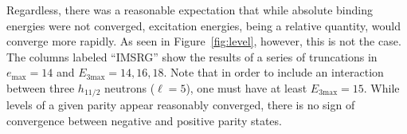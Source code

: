 \documentclass[twocolumn,prc,showpacs,preprintnumbers,amsmath,amssymb,superscriptaddress,nofootinbib,aps,10pt]{revtex4-1}
\begin{document}
Regardless, there was a reasonable expectation that while absolute binding energies were not converged, excitation energies, being a relative quantity, would converge more rapidly. As seen in Figure~\ref{fig:level}, however, this is not the case.
The columns labeled ``IMSRG'' show the results of a series of truncations in $e_{\mathrm{max}}=14$ and $E_{3\mathrm{max}}=14,16,18$.
Note that in order to include an interaction between three $h_{11/2}$ neutrons ($\ell=5$), one must have at least $E_{3\mathrm{max}}=15$. 
While levels of a given parity appear reasonably converged, there is no sign of convergence between negative and positive parity states.

\end{document}
